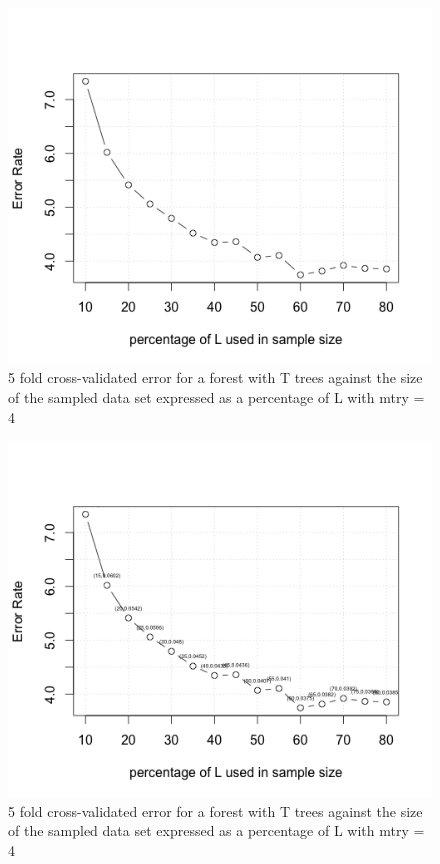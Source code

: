 \documentclass[12pt]{article}%
\begin{document}
\begin{figure}
\includegraphics{part4.png}
\caption{5 fold cross-validated error for a forest with T trees against the size of the sampled data set expressed as a percentage of L with mtry = 4}
\end{figure}

\begin{figure}
\includegraphics{part41.png}
\caption{5 fold cross-validated error for a forest with T trees against the size of the sampled data set expressed as a percentage of L with mtry = 4}
\end{figure}
\end{document}
